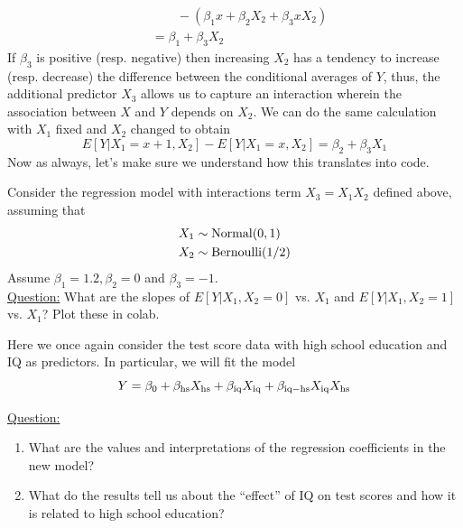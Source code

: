\begin{itemize}
\begin{align*}
 &\quad\quad - \left(\beta_1 x + \beta_2 X_2 + \beta_3 x X_2\right)\\
 &= \beta_1 + \beta_3 X_2
\end{align*}
If $\beta_3$ is positive (resp. negative) then increasing $X_2$ has a tendency to increase (resp. decrease) the difference between the conditional averages of $Y$, thus, the additional predictor $X_3$ allows us to capture an interaction wherein the association between $X$ and $Y$ depends on $X_2$. We can do the same calculation with $X_1$ fixed and $X_2$ changed to obtain 
\begin{equation*}
 E[Y|X_1 = x+1,X_2] - E[Y|X_1 = x,X_2] = \beta_2 + \beta_3X_1
\end{equation*}
Now as always, let's make sure we understand how this translates into code. 


\begin{example}
Consider the regression model with interactions term $X_3 = X_1X_2$ defined above, assuming that 
\begin{align*}
X_1 &\sim {\rm Normal}(0,1)\\
X_2 &\sim {\rm Bernoulli}(1/2)
\end{align*}
Assume $\beta_1 = 1.2,\beta_2 = 0$ and $\beta_3 =-1$. \\


\noindent
\underline{Question:} What are the slopes of $E[Y|X_1,X_2=0]$ vs. $X_1$ and $E[Y|X_1,X_2=1]$ vs. $X_1$? Plot these in colab. 


\end{example}

\begin{example}
Here we once again consider the test score data with high school education and IQ as predictors. In particular, we will fit the model
\begin{equation*}
Y = \beta_0 + \beta_{\rm hs}X_{\rm hs} + \beta_{\rm iq}X_{\rm iq} + \beta_{\rm iq-hs}X_{\rm iq}X_{\rm hs}
\end{equation*}


\noindent
\underline{Question:} 
\begin{enumerate}[label=(\alph*)]
\item What are the values and interpretations of the regression coefficients in the new model?
\item What do the results tell us about the ``effect'' of IQ on test scores and how it is related to high school education? \\
\end{enumerate}


\end{example}
\end{itemize}
